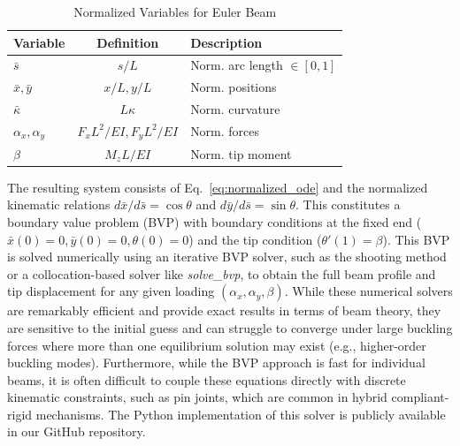 \documentclass[colorlinks,upint,subscriptcorrection,varvw,hyphenate,balance]{asmeconf} %
\newcommand{\xbar}{\bar{x}}
\newcommand{\ybar}{\bar{y}}
\newcommand{\sbar}{\bar{s}}
\newcommand{\kbar}{\bar{\kappa}}
\begin{document}
\begin{table}[ht]
\centering
\caption{Normalized Variables for Euler Beam}
\label{tab:normalization}
\begin{tabular}{lcl}
\toprule
\textbf{Variable} & \textbf{Definition} & \textbf{Description} \\
\midrule
$\sbar$ & $s/L$ & Norm. arc length $\in [0,1]$ \\
$\xbar, \ybar$ & $x/L, y/L$ & Norm. positions \\
$\kbar$ & $L\kappa$ & Norm. curvature \\
$\alpha_x, \alpha_y$ & $F_x L^2 / EI, F_y L^2 / EI$ & Norm. forces \\
$\beta$ & $M_z L / EI$ & Norm. tip moment \\
\bottomrule
\end{tabular}
\end{table}

The resulting system consists of Eq.~\eqref{eq:normalized_ode} and the normalized kinematic relations $d\xbar/d\sbar = \cos\theta$ and $d\ybar/d\sbar = \sin\theta$. This constitutes a boundary value problem (BVP) with boundary conditions at the fixed end ($\xbar(0)=0, \ybar(0)=0, \theta(0)=0$) and the tip condition ($\theta'(1)=\beta$). This BVP is solved numerically using an iterative BVP solver, such as the shooting method or a collocation-based solver like \textit{solve\_bvp}, to obtain the full beam profile and tip displacement for any given loading $(\alpha_x, \alpha_y, \beta)$. While these numerical solvers are remarkably efficient and provide exact results in terms of beam theory, they are sensitive to the initial guess and can struggle to converge under large buckling forces where more than one equilibrium solution may exist (e.g., higher-order buckling modes). Furthermore, while the BVP approach is fast for individual beams, it is often difficult to couple these equations directly with discrete kinematic constraints, such as pin joints, which are common in hybrid compliant-rigid mechanisms. The Python implementation of this solver is publicly available in our GitHub repository.
\end{document}
